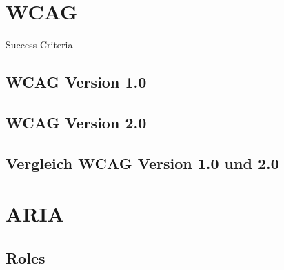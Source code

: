 \documentclass[a4paper,bibtotoc,oneside]{scrbook}
\begin{document}
\chapter[Zweites Kapitel]{WCAG}
Success Criteria

\section[Erster Abschnitt]{WCAG Version 1.0}

\section[Zweiter Abschnitt]{WCAG Version 2.0}

\section[Zweiter Abschnitt]{Vergleich WCAG Version 1.0 und 2.0}

\chapter[Drittes Kapitel]{ARIA}

\section[Erster Abschnitt]{Roles}







\end{document}
